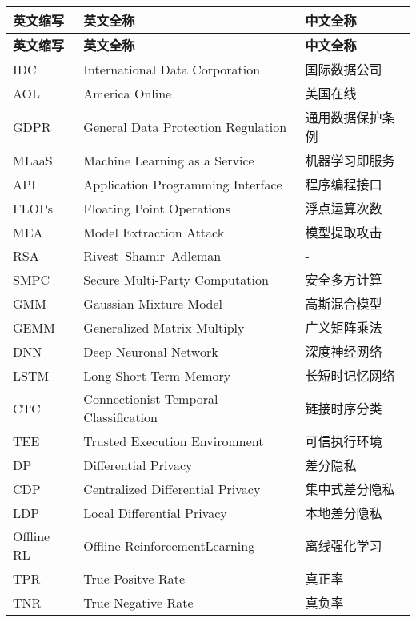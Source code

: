 \cleardoublepage
{}
\begin{center}
    \begin{longtable}{m{2cm}m{8cm}m{5cm}}
        \toprule
        \textbf{英文缩写}&\textbf{英文全称}&\textbf{中文全称}\\
        \midrule
        \endfirsthead
        \toprule
        \textbf{英文缩写}&\textbf{英文全称}&\textbf{中文全称}\\
        \midrule
        \endhead 
        \bottomrule
        \endfoot
        \bottomrule
        \endlastfoot
        IDC&International Data Corporation&国际数据公司\\
        AOL&America Online&美国在线\\
        GDPR&General Data Protection Regulation&通用数据保护条例\\
        MLaaS&Machine Learning as a Service&机器学习即服务\\
        API&Application Programming Interface&程序编程接口\\
        FLOPs&Floating Point Operations&浮点运算次数\\
        MEA&Model Extraction Attack&模型提取攻击\\
        RSA&Rivest–Shamir–Adleman&-\\
        SMPC&Secure Multi-Party Computation&安全多方计算\\
        GMM&Gaussian Mixture Model&高斯混合模型\\
        GEMM&Generalized Matrix Multiply&广义矩阵乘法\\
        DNN&Deep Neuronal Network&深度神经网络\\
        LSTM&Long Short Term Memory&长短时记忆网络\\
        CTC&Connectionist Temporal Classification&链接时序分类\\
        TEE&Trusted Execution Environment&可信执行环境\\

        DP&Differential Privacy&差分隐私\\
        CDP&Centralized Differential Privacy&集中式差分隐私\\
        LDP&Local Differential Privacy&本地差分隐私\\
        Offline RL&Offline ReinforcementLearning&离线强化学习\\
        
        TPR&True Positve Rate&真正率\\
        TNR&True Negative Rate&真负率\\
        
	\end{longtable}
\end{center}